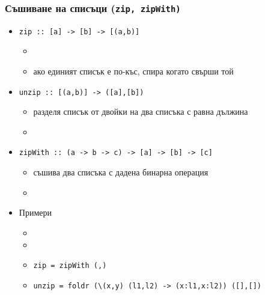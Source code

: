 \documentclass{beamer}
\begin{document}
\begin{frame}
  \frametitle{Съшиване на списъци (\tt{zip}, \tt{zipWith})}
  \begin{itemize}[<+->]
  \item \tt{zip :: [a] -> [b] -> [(a,b)]}
    \begin{itemize}
    \item {}
    \item ако единият списък е по-къс, спира когато свърши той
  \end{itemize}
  \item \tt{unzip :: [(a,b)] -> ([a],[b])}
    \begin{itemize}
    \item разделя списък от двойки на два списъка с равна
      дължина
    \item {}
    \end{itemize}
  \item \tt{zipWith :: (a -> b -> c) -> [a] -> [b] -> [c]}
    \begin{itemize}
    \item съшива два списъка с дадена бинарна операция
    \item {}
    \end{itemize}
  \item Примери
    \begin{itemize}
    \item {}
    \item {}
    \item \tt{zip = zipWith (,)}
    \item \tt{unzip = foldr (\textbackslash(x,y) (l1,l2) -> (x:l1,x:l2)) ([],[])}
    \end{itemize}
  \end{itemize}
\end{frame}
\end{document}
